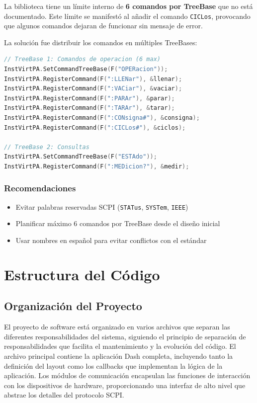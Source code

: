 \documentclass[12pt,a4paper]{article}
\begin{document}
La biblioteca tiene un límite interno de \textbf{6 comandos por TreeBase} que no está documentado. Este límite se manifestó al añadir el comando \texttt{CICLos}, provocando que algunos comandos dejaran de funcionar sin mensaje de error.

La solución fue distribuir los comandos en múltiples TreeBases:

\begin{lstlisting}[language=C++, caption=Distribución en múltiples TreeBases]
// TreeBase 1: Comandos de operacion (6 max)
InstVirtPA.SetCommandTreeBase(F("OPERacion"));
InstVirtPA.RegisterCommand(F(":LLENar"), &llenar);
InstVirtPA.RegisterCommand(F(":VACiar"), &vaciar);
InstVirtPA.RegisterCommand(F(":PARAr"), &parar);
InstVirtPA.RegisterCommand(F(":TARAr"), &tarar);
InstVirtPA.RegisterCommand(F(":CONsigna#"), &consigna);
InstVirtPA.RegisterCommand(F(":CICLos#"), &ciclos);

// TreeBase 2: Consultas
InstVirtPA.SetCommandTreeBase(F("ESTAdo"));
InstVirtPA.RegisterCommand(F(":MEDicion?"), &medir);
\end{lstlisting}

\subsubsection{Recomendaciones}

\begin{itemize}
    \item Evitar palabras reservadas SCPI (\texttt{STATus}, \texttt{SYSTem}, \texttt{IEEE})
    \item Planificar máximo 6 comandos por TreeBase desde el diseño inicial
    \item Usar nombres en español para evitar conflictos con el estándar
\end{itemize}

\section{Estructura del Código}

\subsection{Organización del Proyecto}

El proyecto de software está organizado en varios archivos que separan las diferentes responsabilidades del sistema, siguiendo el principio de separación de responsabilidades que facilita el mantenimiento y la evolución del código. El archivo principal contiene la aplicación Dash completa, incluyendo tanto la definición del layout como los callbacks que implementan la lógica de la aplicación. Los módulos de comunicación encapsulan las funciones de interacción con los dispositivos de hardware, proporcionando una interfaz de alto nivel que abstrae los detalles del protocolo SCPI.
\end{document}
